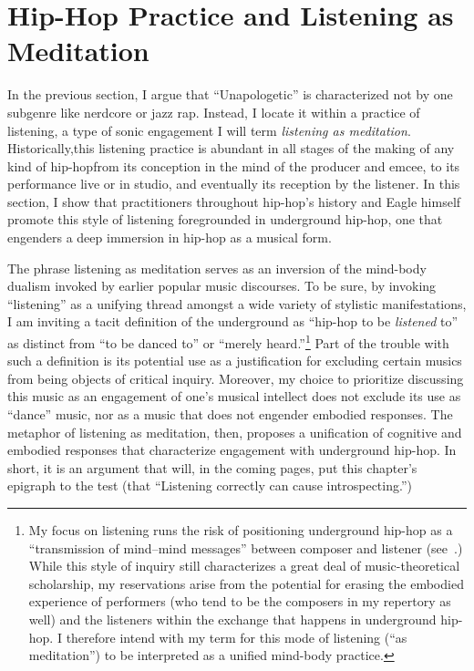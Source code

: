 \section{Hip-Hop Practice and Listening as Meditation} \label{listeningasmeditation}

In the previous section, I argue that ``Unapologetic'' is characterized not by one subgenre like
nerdcore or jazz rap. Instead, I locate it within a practice of listening, a type of sonic engagement
I will term \emph{listening as meditation}. Historically,this listening practice is abundant in all 
stages of the making of any kind of hip-hop\textemdash from its conception in the mind of the producer 
and emcee, to its performance live or in studio, and eventually its reception by the listener. In this
section, I show that practitioners throughout hip-hop's history and Eagle himself promote this style 
of listening foregrounded in underground hip-hop, one that engenders a deep immersion in hip-hop as a
musical form.

The phrase listening as meditation serves as an inversion of the mind-body dualism invoked by earlier 
popular music discourses. To be sure, by invoking ``listening'' as a unifying thread amongst a wide 
variety of stylistic manifestations, I am inviting a tacit definition of the underground as ``hip-hop 
to be \emph{listened} to'' as distinct from ``to be danced to'' or ``merely heard.''\footnote{
    My focus on listening runs the risk of positioning underground hip-hop as a ``transmission of 
    mind--mind messages'' between composer and listener (see~\autocite[20]{suzanneg.cusickFeministTheoryMusic1994}.) 
    While this style of inquiry still characterizes a great deal of music-theoretical scholarship,
    my reservations arise from the potential for erasing the embodied experience of performers 
    (who tend to be the composers in my repertory as well) and the listeners within the exchange 
    that happens in underground hip-hop. I therefore intend with my term for this mode of listening
    (``as meditation'') to be interpreted as a unified mind-body practice.}
Part of the trouble with such a definition is its potential use as a justification for excluding certain
musics from being objects of critical inquiry. Moreover, my choice to prioritize discussing this music 
as an engagement of one's musical intellect does not exclude its use as ``dance'' music, nor as a music
that does not engender embodied responses. The metaphor of listening as meditation, then, proposes a 
unification of cognitive and embodied responses that characterize engagement with underground hip-hop. 
In short, it is an argument that will, in the coming pages, put this chapter's epigraph to the test 
(that ``Listening correctly can cause introspecting.'')

